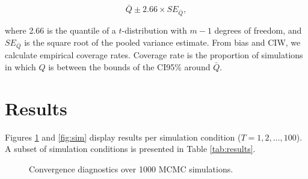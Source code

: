 \documentclass[article]{jss}
\begin{document}
$$\bar{Q} \pm 2.66 \times SE_{\bar{Q}},$$

where 2.66 is the quantile of a $t$-distribution with $m-1$ degrees of freedom, and $SE_{\bar{Q}}$ is the square root of the pooled variance estimate. From bias and CIW, we calculate empirical coverage rates. Coverage rate is the proportion of simulations in which $Q$ is between the bounds of the CI95\% around $\bar{Q}$. 



\section{Results}


Figures \ref{fig:conv} and \ref{fig:sim} display results per simulation condition ($T = 1,2,\dots,100$). A subset of simulation conditions is presented in Table \ref{tab:results}. 

\begin{figure}[h]
  \caption{Convergence diagnostics over 1000 MCMC simulations.}
    \label{fig:conv}
\end{figure}
\end{document}
